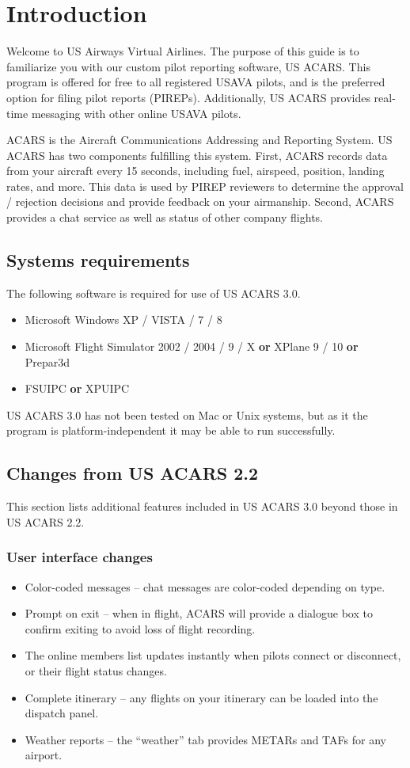 \documentclass[12pt]{article}
\begin{document}
\section{Introduction}
Welcome to US Airways Virtual Airlines. The purpose of this guide is to familiarize you with our custom pilot reporting software, US ACARS. This program is offered for free to all registered USAVA pilots, and is the preferred option for filing pilot reports (PIREPs). Additionally, US ACARS provides real-time messaging with other online USAVA pilots.

ACARS is the Aircraft Communications Addressing and Reporting System. US ACARS has two components fulfilling this system. First, ACARS records data from your aircraft every 15 seconds, including fuel, airspeed, position, landing rates, and more. This data is used by PIREP reviewers to determine the approval / rejection decisions and provide feedback on your airmanship. Second, ACARS provides a chat service as well as status of other company flights.

\subsection{Systems requirements}
The following software is required for use of US ACARS 3.0.

\begin{itemize}
\item{Microsoft Windows XP / VISTA / 7 / 8}
\item{Microsoft Flight Simulator 2002 / 2004 / 9 / X \textbf{or} XPlane 9 / 10 \textbf{or} Prepar3d}
\item{FSUIPC \textbf{or} XPUIPC}
\end{itemize}

US ACARS 3.0 has not been tested on Mac or Unix systems, but as it the program is platform-independent it may be able to run successfully.

\subsection{Changes from US ACARS 2.2}
This section lists additional features included in US ACARS 3.0 beyond those in US ACARS 2.2.

\subsubsection*{User interface changes}
\begin{itemize}
\item{Color-coded messages – chat messages are color-coded depending on type.}
\item{Prompt on exit – when in flight, ACARS will provide a dialogue box to confirm exiting to avoid loss of flight recording.}
\item{The online members list updates instantly when pilots connect or disconnect, or their flight status changes.}
\item{Complete itinerary – any flights on your itinerary can be loaded into the dispatch panel.}
\item{Weather reports – the “weather” tab provides METARs and TAFs for any airport.}
\end{itemize}
\end{document}
